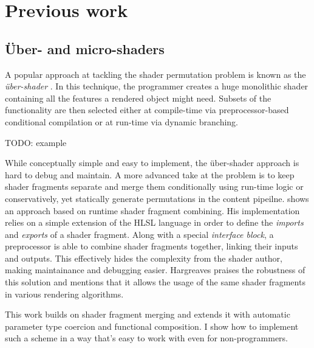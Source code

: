 
\chapter{ Previous work }
\label{Chapter3}

\section{Über- and micro-shaders}

A popular approach at tackling the shader permutation problem is known as the \emph{ über-shader }. In this technique, the programmer creates a huge monolithic shader containing all the features a rendered object might need. Subsets of the functionality are then selected either at compile-time via preprocessor-based conditional compilation or at run-time via dynamic branching.

TODO: example

While conceptually simple and easy to implement, the über-shader approach is hard to debug and maintain. A more advanced take at the problem is to keep shader fragments separate and merge them conditionally using run-time logic or conservatively, yet statically generate permutations in the content pipeilne. \citet{Hargreaves04} shows an approach based on runtime shader fragment combining. His implementation relies on a simple extension of the HLSL language in order to define the \emph{imports} and \emph{exports} of a shader fragment. Along with a special \emph{interface block}, a preprocessor is able to combine shader fragments together, linking their inputs and outputs. This effectively hides the complexity from the shader author, making maintainance and debugging easier. Hargreaves praises the robustness of this solution and mentions that it allows the usage of the same shader fragments in various rendering algorithms.

This work builds on shader fragment merging and extends it with automatic parameter type coercion and functional composition. I show how to implement such a scheme in a way that's easy to work with even for non-programmers.


